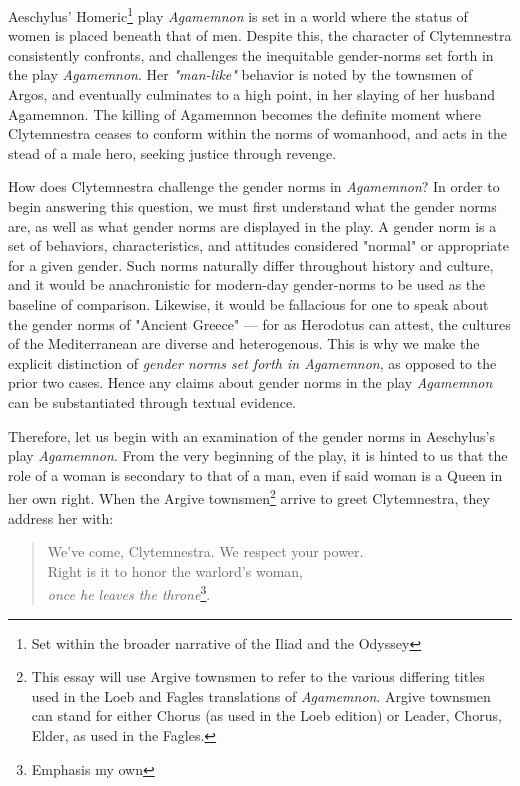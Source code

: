 
Aeschylus' Homeric\footnote{Set within the broader narrative of the Iliad
and the Odyssey} play \emph{Agamemnon} is set in a world where the status of
women is placed beneath that of men. Despite this, the character of
Clytemnestra consistently confronts, and challenges the inequitable gender-norms
set forth in the play \emph{Agamemnon}. Her \emph{"man-like"} behavior is noted
by the townsmen of Argos, and eventually culminates to a high point, in her
slaying of her husband Agamemnon. The killing of Agamemnon becomes the definite
moment where Clytemnestra ceases to conform within the norms of womanhood, and
acts in the stead of a male hero, seeking justice through revenge.

How does Clytemnestra challenge the gender norms in \emph{Agamemnon}? In order
to begin answering this question, we must first understand what the gender norms
are, as well as what gender norms are displayed in the play. A gender norm is a
set of behaviors, characteristics, and attitudes considered "normal" or
appropriate for a given gender. Such norms naturally differ throughout history
and culture, and it would be anachronistic for modern-day gender-norms to be
used as the baseline of comparison. Likewise, it would be fallacious for one to
speak about the gender norms of "Ancient Greece" --- for as Herodotus can
attest, the cultures of the Mediterranean are diverse and heterogenous. This is
why we make the explicit distinction of \emph{gender norms set forth in
Agamemnon}, as opposed to the prior two cases. Hence any claims about
gender norms in the play \emph{Agamemnon} can be substantiated through textual
evidence.

Therefore, let us begin with an examination of the gender norms in Aeschylus's
play \emph{Agamemnon}. From the very beginning of the play, it is hinted to us
that the role of a woman is secondary to that of a man, even if said woman is a
Queen in her own right. When the Argive townsmen\footnote{This essay
will use Argive townsmen to refer to the various differing titles used in the
Loeb and Fagles translations of \emph{Agamemnon}. Argive townsmen can stand for
either Chorus (as used in the Loeb edition) or Leader, Chorus, Elder, as used in
the Fagles.} arrive to greet Clytemnestra, they address her with:

\begin{quote}
    We've come, Clytemnestra. We respect your power. \\
    Right is it to honor the warlord's woman, \\
    \textit{once he leaves the throne}\footnote{Emphasis my own}.

    \autocite[258]{fagles}
\end{quote}

